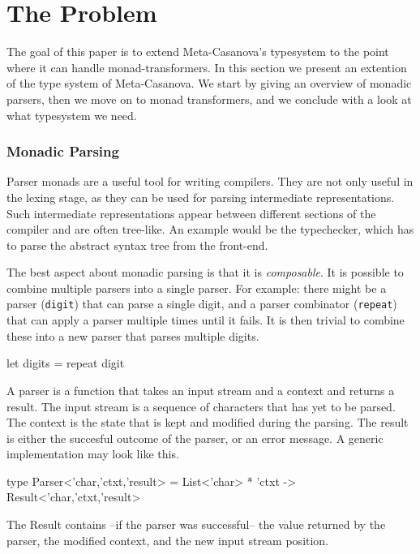 \section{The Problem}
  The goal of this paper is to extend Meta-Casanova's typesystem to the point where it can handle monad-transformers.
  In this section we present an extention of the type system of Meta-Casanova.
  We start by giving an overview of monadic parsers,
  then we move on to monad transformers,
  and we conclude with a look at what typesystem we need.
  
  \subsubsection*{Monadic Parsing}
  Parser monads are a useful tool for writing compilers.
  They are not only useful in the lexing stage, as they can be used for parsing intermediate representations.
  Such intermediate representations appear between different sections of the compiler and are often tree-like.
  An example would be the typechecker, which has to parse the abstract syntax tree from the front-end.

  The best aspect about monadic parsing is that it is \textit{composable}.
  It is possible to combine multiple parsers into a single parser.
  For example: there might be a parser (\texttt{digit}) that can parse a single digit,
  and a parser combinator (\texttt{repeat}) that can apply a parser multiple times until it fails.
  It is then trivial to combine these into a new parser that parses multiple digits.

  \begin{code}[language=Caml]
  let digits = repeat digit
  \end{code}

  A parser is a function that takes an input stream and a context and returns a result.
  The input stream is a sequence of characters that has yet to be parsed.
  The context is the state that is kept and modified during the parsing.
  The result is either the succesful outcome of the parser, or an error message.
  A generic implementation may look like this.

  \begin{code}[language=Caml]
  type Parser<'char,'ctxt,'result> =
    List<'char> * 'ctxt
      -> Result<'char,'ctxt,'result>
  \end{code}
  
  The Result contains --if the parser was successful-- the value returned by the parser, the modified context, and the new input stream position.
  
